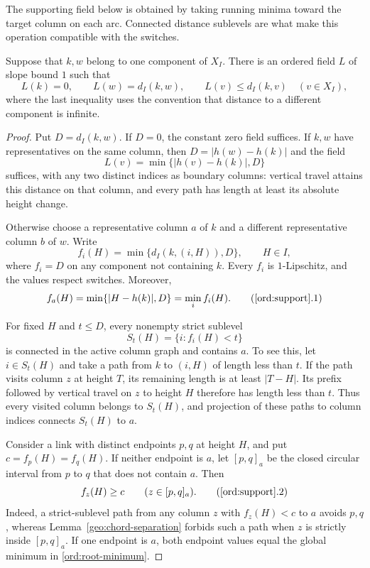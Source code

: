 The supporting field below is obtained by taking running minima toward
the target column on each arc.  Connected distance sublevels are what make
this operation compatible with the switches.

\begin{lemma}\label{ord:support}
Suppose that $k,w$ belong to one component of $X_I$. There is an
ordered field $L$ of slope bound $1$ such that
\[
 L(k)=0,\qquad L(w)=d_I(k,w),\qquad
 L(v)\le d_I(k,v)\quad(v\in X_I),
\]
where the last inequality uses the convention that distance to a
different component is infinite.
\end{lemma}

\begin{proof}
Put $D=d_I(k,w)$. If $D=0$, the constant zero field suffices. If $k,w$
have representatives on the same column, then
$D=|h(w)-h(k)|$ and the field
\[
 L(v)=\min\{|h(v)-h(k)|,D\}
\]
suffices, with any two distinct indices as boundary columns: vertical travel attains this distance on that column, and
every path has length at least its absolute height change.

Otherwise choose a representative column $a$ of $k$ and a different
representative column $b$ of $w$. Write
\[
 f_i(H)=\min\{d_I(k,(i,H)),D\},\qquad H\in I,
\]
where $f_i=D$ on any component not containing $k$. Every $f_i$ is
$1$-Lipschitz, and the values respect switches. Moreover,
\[
 f_a(H)=\min\{|H-h(k)|,D\}=\min_i f_i(H).
\tag{\ref{ord:support}.1}\label{ord:root-minimum}
\]

For fixed $H$ and $t\le D$, every nonempty strict sublevel
\[
 S_t(H)=\{i:f_i(H)<t\}
\]
is connected in the active column graph and contains $a$. To see
this, let $i\in S_t(H)$ and take a path from $k$ to $(i,H)$ of length
less than $t$. If the path visits column $z$ at height $T$, its
remaining length is at least $|T-H|$. Its prefix followed by vertical
travel on $z$ to height $H$ therefore has length less than $t$.
Thus every visited column belongs to $S_t(H)$, and projection of
these paths to column indices connects $S_t(H)$ to $a$.

Consider a link with distinct endpoints $p,q$ at height $H$, and put
$c=f_p(H)=f_q(H)$. If neither endpoint is $a$, let $[p,q]_a$ be the
closed circular interval from $p$ to $q$ that does not contain $a$.
Then
\[
 f_z(H)\ge c\qquad(z\in[p,q]_a).
\tag{\ref{ord:support}.2}\label{ord:collision}
\]
Indeed, a strict-sublevel path from any column $z$ with $f_z(H)<c$
to $a$ avoids $p,q$, whereas Lemma~\ref{geo:chord-separation}
forbids such a path when $z$ is strictly inside $[p,q]_a$.
If one endpoint is $a$, both endpoint values equal the global
minimum in \eqref{ord:root-minimum}.


\end{proof}
